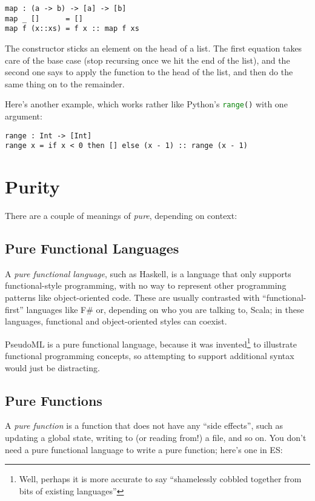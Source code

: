 \begin{lstlisting}[language=pseudoml]
map : (a -> b) -> [a] -> [b]
map _ []      = []
map f (x::xs) = f x :: map f xs
\end{lstlisting}

The \mlil{::} constructor sticks an element on the head of a list. The first equation takes care of the base case (stop recursing once we hit the end of the list), and the second one says to apply the function to the head of the list, and then do the same thing on to the remainder.

Here's another example, which works rather like Python's \lstinline[language=python]!range()! with one argument:

\begin{lstlisting}[language=pseudoml]
range : Int -> [Int]
range x = if x < 0 then [] else (x - 1) :: range (x - 1)
\end{lstlisting}

\section{Purity}\label{sec:purity}

There are a couple of meanings of \emph{pure}, depending on context:

\subsection{Pure Functional Languages}

A \emph{pure functional language}, such as Haskell, is a language that only supports functional-style programming, with no way to represent other programming patterns like object-oriented code. These are usually contrasted with ``functional-first'' languages like F\# or, depending on who you are talking to, Scala; in these languages, functional and object-oriented styles can coexist.

PseudoML is a pure functional language, because it was invented\footnote{Well, perhaps it is more accurate to say ``shamelessly cobbled together from bits of existing languages''} to illustrate functional programming concepts, so attempting to support additional syntax would just be distracting.

\subsection{Pure Functions}

A \emph{pure function} is a function that does not have any ``side effects'', such as updating a global state, writing to (or reading from!) a file, and so on. You don't need a pure functional language to write a pure function; here's one in ES:


